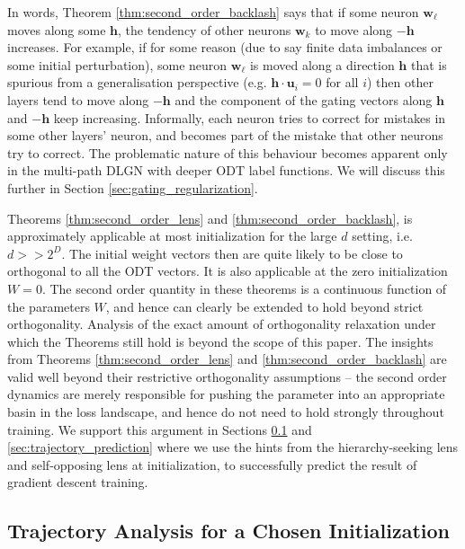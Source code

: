 \documentclass{article}
\theoremstyle{plain}
\theoremstyle{definition}
\theoremstyle{remark}
\newcommand{\1}{{\mathbf 1}}
\newcommand{\0}{{\mathbf 0}}
\newcommand{\h}{{\mathbf h}}
\newcommand{\w}{{\mathbf w}}
\newcommand{\bu}{{\mathbf u}}
\renewcommand{\>}{{\rightarrow}}
\begin{document}
In words,  Theorem \ref{thm:second_order_backlash} says that if some neuron $\w_\ell$ moves along some $\h$, the tendency of other neurons $\w_k$ to move along $-\h$ increases. For example, if for some reason (due to say finite data imbalances or some initial perturbation), some neuron $\w_\ell$ is moved along a direction $\h$ that is spurious from a generalisation perspective (e.g. $\h \cdot \bu_i =0$ for all $i$) then other layers tend to move along $-\h$ and the component of the gating vectors along $\h$ and $-\h$ keep increasing. Informally,  each neuron tries to correct for mistakes in some other layers' neuron, and becomes part of the mistake that other neurons try to correct.  The problematic nature of this behaviour becomes apparent only in the multi-path DLGN with deeper ODT label functions.  We will discuss this further in Section \ref{sec:gating_regularization}.
 
Theorems \ref{thm:second_order_lens} and \ref{thm:second_order_backlash}, is approximately applicable at most initialization for the large $d$ setting, i.e. $d >> 2^D$. The initial weight vectors then are quite likely to be close to orthogonal to all the ODT vectors. It is also applicable at the zero initialization $W=0$. The second order quantity in these theorems is a continuous function of the parameters $W$, and hence can clearly be extended to hold beyond strict orthogonality. Analysis of the exact amount of orthogonality relaxation under which the Theorems still hold is beyond the scope of this paper. The insights from Theorems \ref{thm:second_order_lens} and \ref{thm:second_order_backlash} are valid well beyond their restrictive orthogonality assumptions -- the second order dynamics are merely responsible for pushing the parameter into an appropriate basin in the loss landscape, and hence do not need to hold strongly throughout training. We support this argument in Sections \ref{sec:single_trajectory} and \ref{sec:trajectory_prediction} where we use the hints from the hierarchy-seeking lens and self-opposing lens at initialization, to successfully predict the result of gradient descent training.

\subsection{Trajectory Analysis for a Chosen Initialization}
\label{sec:single_trajectory}
\end{document}
